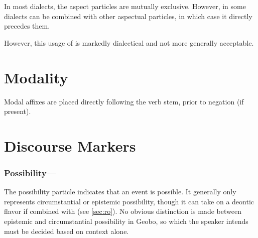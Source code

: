 \documentclass[a4paper,11pt,oneside,openany]{memoir}
\begin{document}
In most dialects, the aspect particles are mutually exclusive. However, in some dialects 
can be combined with other aspectual particles, in which case it directly precedes them.


However, this usage of 
is markedly dialectical and not more generally acceptable.

\section{Modality}

Modal affixes are placed directly following the verb stem, prior to negation (if present).

\section{Discourse Markers}



\subsubsection{Possibility---}

The possibility particle 
indicates that an event is possible. It generally only represents circumstantial or epistemic possibility, though it can take on a deontic flavor if combined with 
(see \ref{sec:ro}). No obvious distinction is made between epistemic and circumstantial possibility in Geobo{\engma}, so which the speaker intends must be decided based on context alone.

\end{document}
